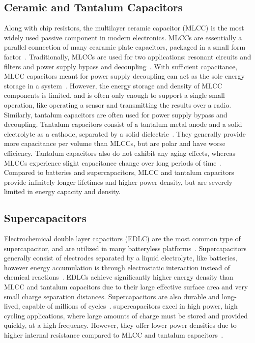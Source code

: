 \subsection{Ceramic and Tantalum Capacitors}
Along with chip resistors, the multilayer ceramic capacitor (MLCC) is the most widely used passive component in modern electronics. MLCCs are essentially a parallel connection of many cearamic plate capacitors, packaged in a small form factor~\cite{pan2010brief}. Traditionally, MLCCs are used for two applications: resonant circuits and filters and power supply bypass and decoupling~\cite{pan2010brief}. With sufficient capacitance, MLCC capacitors meant for power supply decoupling can act as the sole energy storage in a system~\cite{hesterFlicker17,yervaGrafting12,campbellEnergy14}. However, the energy storage and density of MLCC components is limited, and is often only enough to support a single small operation, like operating a sensor and transmitting the results over a radio. Similarly, tantalum capacitors are often used for power supply bypass and decoupling. Tantalum capacitors consist of a tantalum metal anode and a solid electrolyte as a cathode, separated by a solid dielectric~\cite{gill1994basic}. They generally provide more capacitance per volume than MLCCs, but are polar and have worse efficiency.
Tantalum capacitors also do not exhibit any aging effects, whereas MLCCs experience slight capacitance change over long periods of time~\cite{kemetUpdate}.
Compared to batteries and supercapacitors, MLCC and tantalum capacitors provide infinitely longer lifetimes and higher power density, but are severely limited in energy capacity and density.

\subsection{Supercapacitors}
Electrochemical double layer capacitors (EDLC) are the most common type of supercapacitor, and are utilized in many batteryless platforms~\cite{colinReconfigurable18,libich2018supercapacitors,nardello2019camaroptera}.
Supercapacitors generally consist of electrodes separated by a liquid electrolyte, like batteries, however energy accumulation is through electrostatic interaction instead of chemical reactions~\cite{libich2018supercapacitors,vangari2013supercapacitors}.
EDLCs achieve significantly higher energy density than MLCC and tantalum capacitors due to their large effective surface area and very small charge separation distances. Supercapacitors are also durable and long-lived, capable of millions of cycles~\cite{libich2018supercapacitors}. 
supercapacitors excel in high power, high cycling applications, where large amounts of charge must be stored and provided quickly, at a high frequency.
However, they offer lower power densities due to higher internal resistance compared to MLCC and tantalum capacitors~\cite{vangari2013supercapacitors}. 


